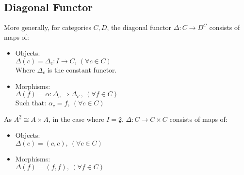 \subsection{Diagonal Functor}
\begin{definition}
  More generally, for categories $C, D$, the diagonal functor $\Delta: C \to
  D^C$ consists of maps of: \parencite{leinster:basic_category_theory}
  \begin{itemize}
    \item Objects:\\
      $\Delta(c) = \Delta_c : I \to C,\ (\forall c\in C)$\\
      Where $\Delta_c$ is the constant functor.
    \item Morphisms:\\
      $\Delta(f) = \alpha : \Delta_c \Rightarrow \Delta_{c'}
      ,\ (\forall f\in C)$\\
      Such that:
      $\alpha_c = f,\ (\forall c\in C)$
  \end{itemize}
\end{definition}

\begin{remark}
  As $A^{\underline{2}} \cong A\times A$, in the case where $I = \underline{2}$,
  $\Delta: C\to C\times C$ consists of maps of:
  \parencite{awodey:category_theory}
  \begin{itemize}
    \item Objects:\\
      $\Delta(c) = (c, c),\ (\forall c\in C)$
    \item Morphisms:\\
      $\Delta(f) = (f, f),\ (\forall f\in C)$
  \end{itemize}
\end{remark}
